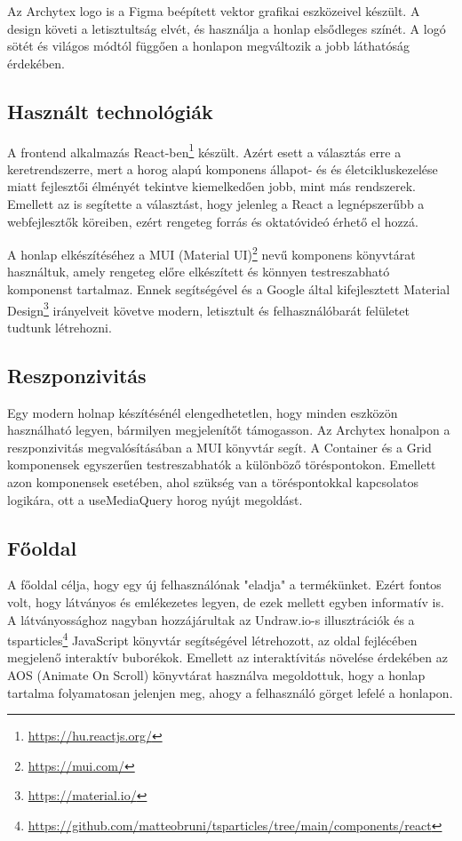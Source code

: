 Az Archytex logo is a Figma beépített vektor grafikai eszközeivel készült. A design követi a letisztultság elvét, és használja a honlap elsődleges színét. A logó sötét és világos módtól függően a honlapon megváltozik a jobb láthatóság érdekében.

\subsection{Használt technológiák}
A frontend alkalmazás React-ben\footnote{\url{https://hu.reactjs.org/}} készült. Azért esett a választás erre a keretrendszerre, mert a horog alapú komponens állapot- és és életcikluskezelése miatt fejlesztői élményét tekintve kiemelkedően jobb, mint más rendszerek. Emellett az is segítette a választást, hogy jelenleg a React a legnépszerűbb a webfejlesztők köreiben\cite{most-used-web-frameworks}, ezért rengeteg forrás és oktatóvideó érhető el hozzá.

A honlap elkészítéséhez a MUI (Material UI)\footnote{\url{https://mui.com/}} nevű komponens könyvtárat használtuk, amely rengeteg előre elkészített és könnyen testreszabható komponenst tartalmaz. Ennek segítségével és a Google által kifejlesztett Material Design\footnote{\url{https://material.io/}} irányelveit követve modern, letisztult és felhasználóbarát felületet tudtunk létrehozni.

\subsection{Reszponzivitás}
Egy modern holnap készítésénél elengedhetetlen, hogy minden eszközön használható legyen, bármilyen megjelenítőt támogasson. Az Archytex honalpon a reszponzivitás megvalósításában a MUI könyvtár segít. A Container és a Grid komponensek egyszerűen testreszabhatók a különböző töréspontokon. Emellett azon komponensek esetében, ahol szükség van a töréspontokkal kapcsolatos logikára, ott a useMediaQuery horog nyújt megoldást.

\subsection{Főoldal}
A főoldal célja, hogy egy új felhasználónak "eladja" a termékünket. Ezért fontos volt, hogy látványos és emlékezetes legyen, de ezek mellett egyben informatív is. A látványossághoz nagyban hozzájárultak az Undraw.io-s illusztrációk és a tsparticles\footnote{\url{https://github.com/matteobruni/tsparticles/tree/main/components/react}} JavaScript könyvtár segítségével létrehozott, az oldal fejlécében megjelenő interaktív buborékok. Emellett az interaktívitás növelése érdekében az AOS (Animate On Scroll) könyvtárat használva megoldottuk, hogy a honlap tartalma folyamatosan jelenjen meg, ahogy a felhasználó görget lefelé a honlapon.

